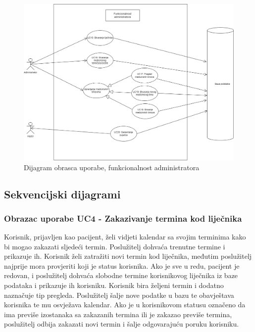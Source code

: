 				    \begin{figure}[H]
			            \includegraphics[width=\textwidth]{slike/administrator_usecase_v2.png} %
			            \caption{Dijagram obrasca uporabe, funkcionalnost administratora}
			            \label{fig:promjene2} %
		            \end{figure}
		            
		            \eject
		            
			\subsection{Sekvencijski dijagrami}
				
				\subsubsection{Obrazac uporabe UC4 - Zakazivanje termina kod liječnika}
				Korisnik, prijavljen kao pacijent, želi vidjeti kalendar sa svojim terminima kako bi mogao zakazati sljedeći termin. Poslužitelj dohvaća trenutne termine i prikazuje ih. Korisnik želi zatražiti novi termin kod liječnika, međutim poslužitelj najprije mora provjeriti koji je status korisnika. Ako je sve u redu, pacijent je redovan, i poslužitelj dohvaća slobodne termine korisnikovog liječnika iz baze podataka i prikazuje ih korisniku. Korisnik bira željeni termin i dodatno naznačuje tip pregleda. Poslužitelj šalje nove podatke u bazu te obavještava korisnika te mu osvježava  kalendar. Ako je u korisnikovom statusu označeno da ima previše izostanaka sa zakazanih termina ili je zakazao previše termina, poslužitelj odbija zakazati novi termin i šalje odgovarajuću poruku korisniku.
				

